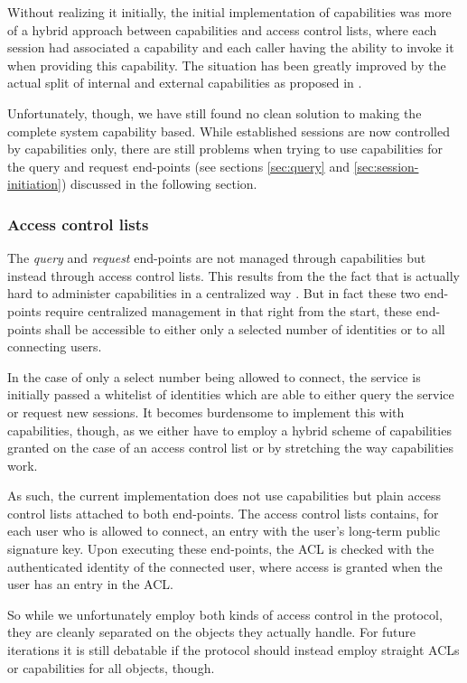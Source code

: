 Without realizing it initially, the initial implementation of capabilities was more of a hybrid approach between capabilities and access control lists, where each session had associated a capability and each caller having the ability to invoke it when providing this capability.
The situation has been greatly improved by the actual split of internal and external capabilities as proposed in \cite{gong1989secure}.

Unfortunately, though, we have still found no clean solution to making the complete system capability based.
While established sessions are now controlled by capabilities only, there are still problems when trying to use capabilities for the query and request end-points (see sections \ref{sec:query} and \ref{sec:session-initiation}) discussed in the following section.

\subsubsection{Access control lists}

The \emph{query} and \emph{request} end-points are not managed through capabilities but instead through access control lists.
This results from the the fact that is actually hard to administer capabilities in a centralized way \cite{shapiro1999eros}.
But in fact these two end-points require centralized management in that right from the start, these end-points shall be accessible to either only a selected number of identities or to all connecting users.

In the case of only a select number being allowed to connect, the service is initially passed a whitelist of identities which are able to either query the service or request new sessions.
It becomes burdensome to implement this with capabilities, though, as we either have to employ a hybrid scheme of capabilities granted on the case of an access control list or by stretching the way capabilities work.

As such, the current implementation does not use capabilities but plain access control lists attached to both end-points.
The access control lists contains, for each user who is allowed to connect, an entry with the user's long-term public signature key.
Upon executing these end-points, the ACL is checked with the authenticated identity of the connected user, where access is granted when the user has an entry in the ACL.

So while we unfortunately employ both kinds of access control in the protocol, they are cleanly separated on the objects they actually handle.
For future iterations it is still debatable if the protocol should instead employ straight ACLs or capabilities for all objects, though.

